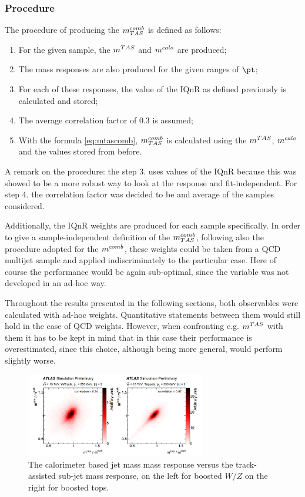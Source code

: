 \subsubsection{Procedure}
The procedure of producing the $m^{comb}_{TAS}$ is defined as follows:
\begin{enumerate}
 \item For the given sample, the $\mtas$ and $\mcal$ are produced;
 \item The mass responses are also produced for the given ranges of $\pt$;
 \item For each of these responses, the value of the IQnR as defined previously is calculated and stored;
 \item The average correlation factor of 0.3 is assumed;
 \item With the formula \ref{eq:mtascomb}, $m^{comb}_{TAS}$ is calculated using the $\mtas$, $\mcal$ and the values stored from before.
\end{enumerate}
A remark on the procedure: the step 3. uses values of the IQnR because this was showed to be a more robust way to look at the response and fit-independent. For step 4. the correlation factor was decided to be and average of the samples considered.

Additionally, the IQnR weights are produced for each sample specifically. In order to give a sample-independent definition of the $m^{comb}_{TAS}$, following also the procedure adopted for the $m^{comb}$, these weights could be taken from a QCD multijet sample and applied indiscriminately to the particular case. Here of course the performance would be again sub-optimal, since the variable was not developed in an ad-hoc way.

Throughout the results presented in the following sections, both observables were calculated with ad-hoc weights. Quantitative statements between them would still hold in the case of QCD weights. However, when confronting e.g. $\mtas$ with them it has to be kept in mind that in this case their performance is overestimated, since this choice, although being more general, would perform slightly worse.

\begin{figure}[!ht]
  \centering
      \includegraphics[width=0.7\textwidth]{jet_part/mcomb/mcomb2.png}
  \caption[$\mcal$ and $\mtas$ correlation plots]{The calorimeter based jet mass mass response versus the track-assisted sub-jet mass response, on the left for boosted $W/Z$ on the right for boosted tops.}
  \label{fig:mcomb2}
\end{figure}

